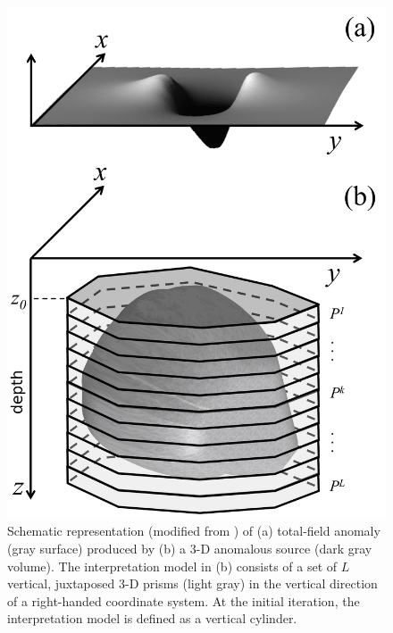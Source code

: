 
\begin{figure}
    \centering
    \includegraphics[scale=1]{figures/observed_data.png}
    \caption{Schematic representation (modified from \cite{oliveirajr-barbosa2013}) of (a) total-field anomaly (gray surface) produced by (b) a 3-D anomalous source (dark gray volume). The interpretation model in (b) consists of a set of $L$ vertical, juxtaposed 3-D prisms (light gray) in the vertical direction of a right-handed coordinate system. At the initial iteration, the interpretation model is defined as a vertical cylinder.}
    \label{fig:obs}
\end{figure}

